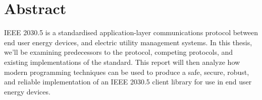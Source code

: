 \chapter*{Abstract}\label{abstract}
IEEE 2030.5 is a standardised application-layer communications protocol between end user energy devices, and electric utility management systems.
In this thesis, we'll be examining predecessors to the protocol, competing protocols, and existing implementations of the standard.
This report will then analyze how modern programming techniques can be used to produce a safe, secure, robust, and reliable implementation of an IEEE 2030.5 client library for use in end user energy devices.
